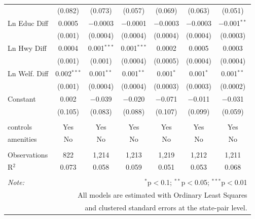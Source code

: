\begin{table}[!htbp]
\begin{tabular}{@{\extracolsep{5pt}}lcccccc}
  & (0.082) & (0.073) & (0.057) & (0.069) & (0.063) & (0.051) \\ 
  Ln Educ Diff & 0.0005 & $-$0.0003 & $-$0.0001 & $-$0.0003 & $-$0.0003 & $-$0.001$^{**}$ \\ 
  & (0.001) & (0.0004) & (0.0004) & (0.0004) & (0.0004) & (0.0003) \\ 
  Ln Hwy Diff & 0.0004 & 0.001$^{***}$ & 0.001$^{***}$ & 0.0002 & 0.0005 & 0.0003 \\ 
  & (0.001) & (0.001) & (0.0004) & (0.0005) & (0.0004) & (0.0004) \\ 
  Ln Welf. Diff & 0.002$^{***}$ & 0.001$^{**}$ & 0.001$^{**}$ & 0.001$^{*}$ & 0.001$^{*}$ & 0.001$^{**}$ \\ 
  & (0.001) & (0.0004) & (0.0004) & (0.0003) & (0.0003) & (0.0002) \\ 
  Constant & 0.002 & $-$0.039 & $-$0.020 & $-$0.071 & $-$0.011 & $-$0.031 \\ 
  & (0.105) & (0.083) & (0.088) & (0.107) & (0.099) & (0.059) \\ 
 \hline \\[-1.8ex] 
controls & Yes & Yes & Yes & Yes & Yes & Yes \\ 
amenities & No & No & No & No & No & No \\ 
\hline \\[-1.8ex] 
Observations & 822 & 1,214 & 1,213 & 1,219 & 1,212 & 1,211 \\ 
R$^{2}$ & 0.073 & 0.058 & 0.059 & 0.051 & 0.053 & 0.068 \\ 
\hline 
\hline \\[-1.8ex] 
\textit{Note:}  & \multicolumn{6}{r}{$^{*}$p$<$0.1; $^{**}$p$<$0.05; $^{***}$p$<$0.01} \\ 
 & \multicolumn{6}{r}{All models are estimated with Ordinary Least Squares} \\ 
 & \multicolumn{6}{r}{and clustered standard errors at the state-pair level.} \\ 
\end{tabular} 
\end{table} 
